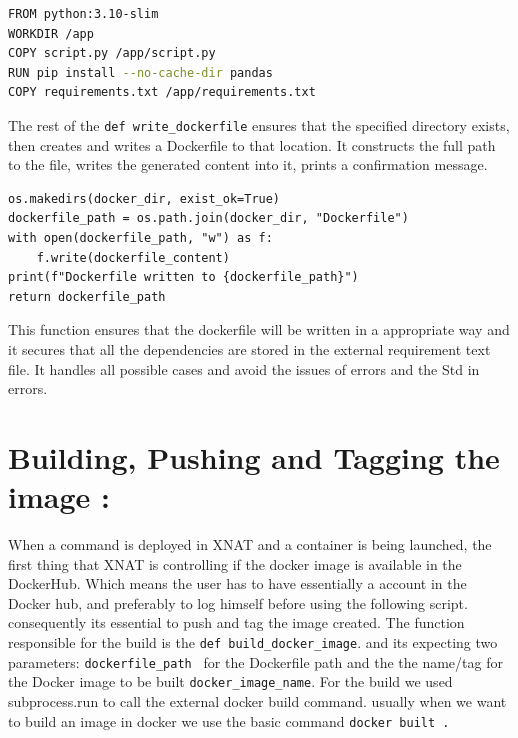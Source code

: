 \begin{lstlisting}[language=bash]
FROM python:3.10-slim
WORKDIR /app
COPY script.py /app/script.py
RUN pip install --no-cache-dir pandas
COPY requirements.txt /app/requirements.txt
\end{lstlisting}
The rest of the \texttt{def write\_dockerfile} ensures that the specified directory exists, then creates and writes a Dockerfile to that location. It constructs the full path to the file, writes the generated content into it, prints a confirmation message.



\begin{lstlisting}
os.makedirs(docker_dir, exist_ok=True)
dockerfile_path = os.path.join(docker_dir, "Dockerfile")
with open(dockerfile_path, "w") as f:
    f.write(dockerfile_content)
print(f"Dockerfile written to {dockerfile_path}")
return dockerfile_path
\end{lstlisting}

This function ensures that the dockerfile will be written in a appropriate way and it secures that all the dependencies are stored in the external requirement text file. It handles all possible cases and avoid the issues of errors and the Std in errors. 

\section{Building, Pushing and Tagging the image :}

When a command is deployed in XNAT and a container is being launched, the first thing that XNAT is controlling if the docker image is available in the DockerHub. Which means the user has to have essentially a account in the Docker hub, and preferably to log himself before using the following script. consequently its essential to push and tag the image created.
The function responsible for the build is the \texttt{def build\_docker\_image}. and its expecting two parameters: 
\texttt{dockerfile\_path } for the Dockerfile path and the the name/tag for the Docker image to be built \texttt{docker\_image\_name}. For the build we used subprocess.run to call the external docker build command.
usually when we want to build an image in docker we use the basic command \texttt{docker built  .} 


